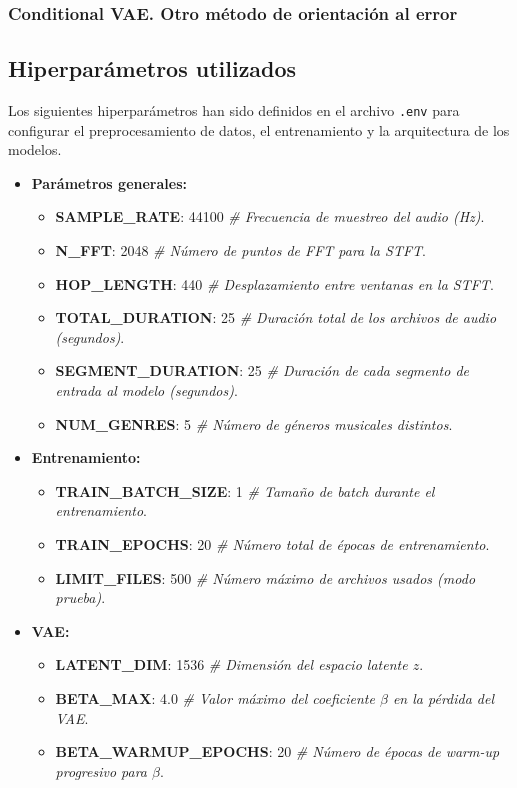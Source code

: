 \subsubsection{Conditional VAE. Otro método de orientación al error}

\subsection*{Hiperparámetros utilizados}

Los siguientes hiperparámetros han sido definidos en el archivo \texttt{.env} para configurar el preprocesamiento de datos, el entrenamiento y la arquitectura de los modelos.

\begin{itemize}
  \item \textbf{Parámetros generales:}
  \begin{itemize}
    \item \textbf{SAMPLE\_RATE}: 44100 \emph{\# Frecuencia de muestreo del audio (Hz)}.
    \item \textbf{N\_FFT}: 2048 \emph{\# Número de puntos de FFT para la STFT}.
    \item \textbf{HOP\_LENGTH}: 440 \emph{\# Desplazamiento entre ventanas en la STFT}.
    \item \textbf{TOTAL\_DURATION}: 25 \emph{\# Duración total de los archivos de audio (segundos)}.
    \item \textbf{SEGMENT\_DURATION}: 25 \emph{\# Duración de cada segmento de entrada al modelo (segundos)}.
    \item \textbf{NUM\_GENRES}: 5 \emph{\# Número de géneros musicales distintos}.
  \end{itemize}

  \item \textbf{Entrenamiento:}
  \begin{itemize}
    \item \textbf{TRAIN\_BATCH\_SIZE}: 1 \emph{\# Tamaño de batch durante el entrenamiento}.
    \item \textbf{TRAIN\_EPOCHS}: 20 \emph{\# Número total de épocas de entrenamiento}.
    \item \textbf{LIMIT\_FILES}: 500 \emph{\# Número máximo de archivos usados (modo prueba)}.
  \end{itemize}

  \item \textbf{VAE:}
  \begin{itemize}
    \item \textbf{LATENT\_DIM}: 1536 \emph{\# Dimensión del espacio latente $z$}.
    \item \textbf{BETA\_MAX}: 4.0 \emph{\# Valor máximo del coeficiente $\beta$ en la pérdida del VAE}.
    \item \textbf{BETA\_WARMUP\_EPOCHS}: 20 \emph{\# Número de épocas de \textit{warm-up} progresivo para $\beta$}.
  \end{itemize}

\end{itemize}

